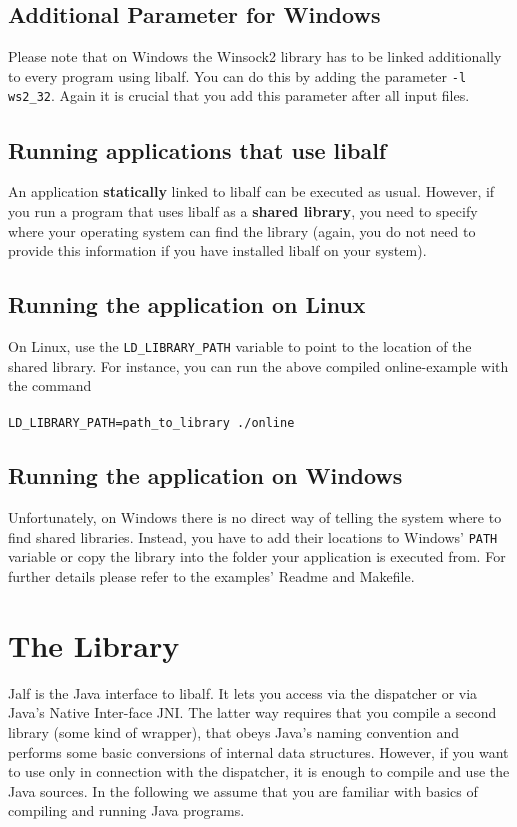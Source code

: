 \subsection*{Additional Parameter for Windows}
Please note that on Windows the Winsock2 library has to be linked additionally to every program using libalf. You can do this by adding the parameter \texttt{-l ws2\_32}. Again it is crucial that you add this parameter after all input files.


\subsection{Running applications that use libalf}
An application \textbf{statically} linked to libalf can be executed as usual. However, if you run a program that uses libalf as a \textbf{shared library}, you need to specify where your operating system can find the library (again, you do not need to provide this information if you have installed libalf on your system).
\subsection{Running the application on Linux}
On Linux, use the \texttt{LD\_LIBRARY\_PATH} variable to point to the location of the shared library. For instance, you can run the above compiled online-example with the command
\\ \\
\texttt{LD\_LIBRARY\_PATH=path\_to\_library ./online}

\subsection{Running the application on Windows}
Unfortunately, on Windows there is no direct way of telling the system where to find shared libraries. Instead, you have to add their locations to Windows’ \texttt{PATH} variable or copy the library into the folder your application is executed from. For further details please refer to the examples’ Readme and Makefile.

\section{The \jalf \java Library}
Jalf is the Java interface to libalf. It lets you access \libalf via the dispatcher or via Java’s Native Inter-face JNI. The latter way requires that you compile a second \cpp library (some kind of wrapper), that obeys Java’s naming convention and performs some basic conversions of internal data structures. However, if you want to use \jalf only in connection with the dispatcher, it is enough to compile and use the Java sources.
In the following we assume that you are familiar with basics of compiling and running Java programs.

